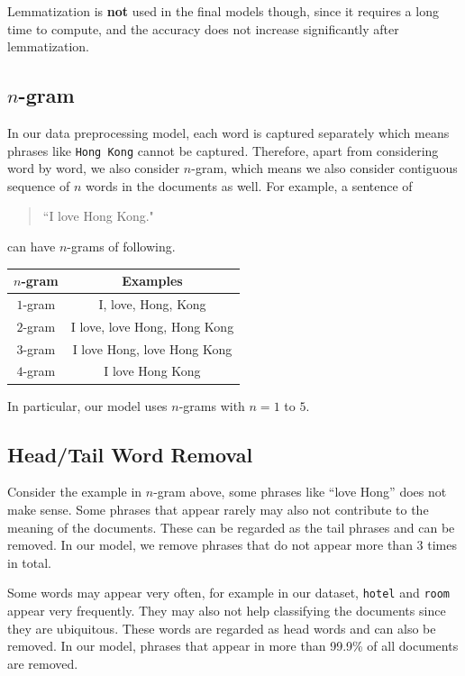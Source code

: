 \documentclass[12pt]{article}
\theoremstyle{remark}
\begin{document}
Lemmatization is \textbf{not} used in the final models though, since it requires a long time to compute, and the accuracy does not increase significantly after lemmatization.

\subsection{\(n\)-gram}
In our data preprocessing model, each word is captured separately which means phrases like \texttt{Hong Kong} cannot be captured. Therefore, apart from considering word by word, we also consider \(n\)-gram, which means we also consider contiguous sequence of \(n\) words in the documents as well. For example, a sentence of
\begin{quote}
	``I love Hong Kong."
\end{quote}
can have \(n\)-grams of following.
\begin{center}
	\begin{tabular}{cc}
		\toprule
		\(n\)-gram & Examples                     \\\midrule
		\(1\)-gram & I, love, Hong, Kong          \\\midrule
		\(2\)-gram & I love, love Hong, Hong Kong \\\midrule
		\(3\)-gram & I love Hong, love Hong Kong  \\\midrule
		\(4\)-gram & I love Hong Kong             \\\bottomrule
	\end{tabular}
\end{center}
In particular, our model uses \(n\)-grams with \(n=1\) to \(5\).

\subsection{Head/Tail Word Removal}
Consider the example in \(n\)-gram above, some phrases like ``love Hong'' does not make sense. Some phrases that appear rarely may also not contribute to the meaning of the documents. These can be regarded as the tail phrases and can be removed. In our model, we remove phrases that do not appear more than 3 times in total.

Some words may appear very often, for example in our dataset, \texttt{hotel} and \texttt{room} appear very frequently. They may also not help classifying the documents since they are ubiquitous. These words are regarded as head words and can also be removed. In our model, phrases that appear in more than 99.9\% of all documents are removed.
\end{document}
